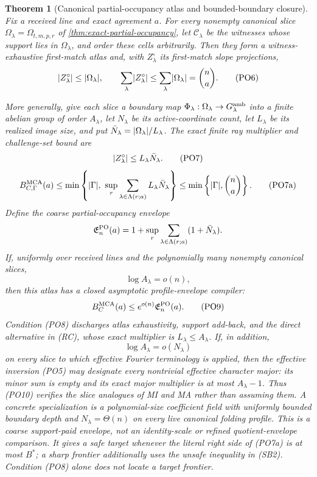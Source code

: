 \documentclass[11pt,a4paper]{amsart}
\numberwithin{equation}{section}
\newtheorem{theorem}{Theorem}[section]
\theoremstyle{remark}
\newcommand{\Ccal}{\mathcal C}\newcommand{\Dcal}{\mathcal D}\newcommand{\Ecal}{\mathcal E}
\begin{document}
\begin{theorem}[Canonical partial-occupancy atlas and bounded-boundary closure]
\label{thm:canonical-partial-occupancy-atlas}
Fix a received line and exact agreement \(a\).  For every nonempty
canonical slice \(\Omega_\lambda=\Omega_{t,m,p,r}\) of
\cref{thm:exact-partial-occupancy}, let \(\Ccal_\lambda\) be the witnesses
whose support lies in \(\Omega_\lambda\), and order these cells
arbitrarily.  Then they form a witness-exhaustive first-match atlas and,
with \(Z_\lambda^\circ\) its first-match slope projections,
\[
 \lvert Z_\lambda^\circ\rvert\le\lvert \Omega_\lambda\rvert,
 \qquad
 \sum_\lambda\lvert Z_\lambda^\circ\rvert
 \le\sum_\lambda\lvert \Omega_\lambda\rvert=\binom na.    \tag{PO6}
\]

More generally, give each slice a boundary map
\(\Phi_\lambda:\Omega_\lambda\to G_\lambda^{\rm amb}\) into a finite
abelian group of order \(A_\lambda\), let \(N_\lambda\) be its
active-coordinate count, let \(L_\lambda\) be its realized image size,
and put
\(\bar N_\lambda=\lvert \Omega_\lambda\rvert/L_\lambda\).  The exact finite ray
multiplier and challenge-set bound are
\[
             \lvert Z_\lambda^\circ\rvert
             \le L_\lambda\bar N_\lambda.          \tag{PO7}
\]
\[
 B_{C,\Gamma}^{\rm MCA}(a)
 \le\min\left\{\lvert \Gamma\rvert,\
       \sup_r\sum_{\lambda\in\Lambda(r;a)}
              L_\lambda\bar N_\lambda\right\}
 \le\min\left\{\lvert \Gamma\rvert,\binom na\right\}.        \tag{PO7a}
\]
Define the coarse partial-occupancy envelope
\[
 \mathfrak E_n^{\rm PO}(a)
 =1+\sup_r\sum_{\lambda\in\Lambda(r;a)}(1+\bar N_\lambda).
\]
If, uniformly over received lines and the polynomially many nonempty
canonical slices,
\[
                         \log A_\lambda=o(n),       \tag{PO8}
\]
then this atlas has a closed asymptotic profile-envelope compiler:
\[
 B_{C}^{\rm MCA}(a)\le
 e^{o(n)}\mathfrak E_n^{\rm PO}(a).                \tag{PO9}
\]
Condition \textup{(PO8)} discharges atlas exhaustivity, support add-back,
and the direct alternative in \textup{(RC)}, whose exact multiplier is
\(L_\lambda\le A_\lambda\).  If, in addition,
\[
                         \log A_\lambda=o(N_\lambda) \tag{PO10}
\]
on every slice to which effective Fourier terminology is applied, then
the effective inversion \textup{(PO5)} may designate every nontrivial
effective character major: its minor sum is empty and its exact major
multiplier is at most \(A_\lambda-1\).  Thus \textup{(PO10)} verifies the
slice analogues of MI and MA rather than assuming them.  A concrete
specialization is a polynomial-size coefficient field with uniformly
bounded boundary depth and \(N_\lambda=\Theta(n)\) on every live canonical
folding profile.  This is a coarse support-paid envelope, not an
identity-scale or refined quotient-envelope comparison.  It gives a safe
target whenever the literal right side of \textup{(PO7a)} is at most
\(B^*\); a sharp frontier additionally uses the unsafe inequality in
\textup{(SB2)}.  Condition \textup{(PO8)} alone does not locate a target
frontier.
\end{theorem}
\end{document}
